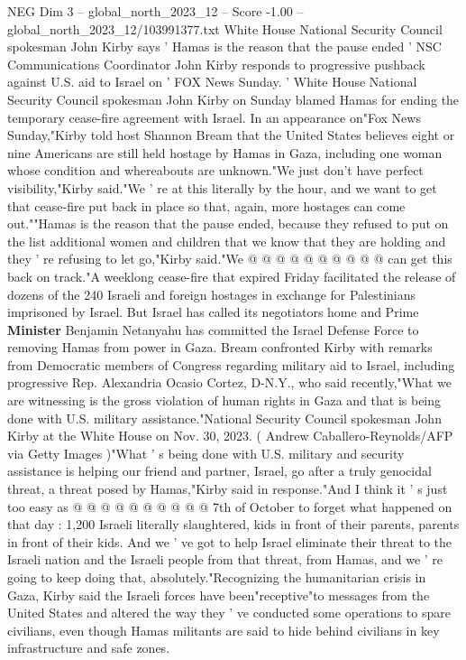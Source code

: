 \begin{textsample}{NEG Dim 3 – global\_north\_2023\_12 – Score -1.00 – global\_north\_2023\_12/103991377.txt}  \label{ex:f3_neg_238}
White House National Security Council spokesman John Kirby says ' Hamas is the reason that the pause ended ' NSC Communications Coordinator John Kirby responds to progressive pushback against U.S. aid to Israel on ' FOX News Sunday. ' White House National Security Council spokesman John Kirby on Sunday blamed Hamas for ending the temporary cease-fire agreement with Israel.
In an appearance on"Fox News Sunday,"Kirby told host Shannon Bream that the United States believes eight or nine Americans are still held hostage by Hamas in Gaza, including one woman whose condition and whereabouts are unknown."We just don't have perfect visibility,"Kirby said."We ' re at this literally by the hour, and we want to get that cease-fire put back in place so that, again, more hostages can come out.""Hamas is the reason that the pause ended, because they refused to put on the list additional women and children that we know that they are holding and they ' re refusing to let go,"Kirby said."We @ @ @ @ @ @ @ @ @ @ can get this back on track."A weeklong cease-fire that expired Friday facilitated the release of dozens of the 240 Israeli and foreign hostages in exchange for Palestinians imprisoned by Israel.
But Israel has called its negotiators home and Prime \textbf{Minister} Benjamin Netanyahu has committed the Israel Defense Force to removing Hamas from power in Gaza.
Bream confronted Kirby with remarks from Democratic members of Congress regarding military aid to Israel, including progressive Rep.
Alexandria Ocasio Cortez, D-N.Y., who said recently,"What we are witnessing is the gross violation of human rights in Gaza and that is being done with U.S. military assistance."National Security Council spokesman John Kirby at the White House on Nov. 30, 2023. ( Andrew Caballero-Reynolds/AFP via Getty Images )"What ' s being done with U.S. military and security assistance is helping our friend and partner, Israel, go after a truly genocidal threat, a threat posed by Hamas,"Kirby said in response."And I think it ' s just too easy as @ @ @ @ @ @ @ @ @ @ 7th of October to forget what happened on that day : 1,200 Israeli literally slaughtered, kids in front of their parents, parents in front of their kids.
And we ' ve got to help Israel eliminate their threat to the Israeli nation and the Israeli people from that threat, from Hamas, and we ' re going to keep doing that, absolutely."Recognizing the humanitarian crisis in Gaza, Kirby said the Israeli forces have been"receptive"to messages from the United States and altered the way they ' ve conducted some operations to spare civilians, even though Hamas militants are said to hide behind civilians in key infrastructure and safe zones.

\end{textsample}
